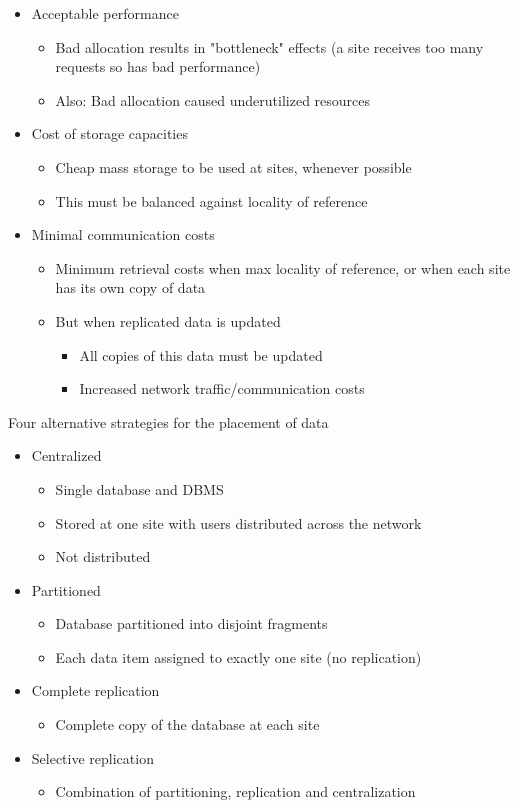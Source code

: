 \documentclass{article}[18pt]
\begin{document}
\begin{itemize}
	\item Acceptable performance
	\begin{itemize}
		\item Bad allocation results in "bottleneck" effects (a site receives too many requests so has bad performance)
		\item Also: Bad allocation caused underutilized resources
	\end{itemize}
	\item Cost of storage capacities
	\begin{itemize}
		\item Cheap mass storage to be used at sites, whenever possible
		\item This must be balanced against locality of reference
	\end{itemize}
	\item Minimal communication costs
	\begin{itemize}
		\item Minimum retrieval costs when max locality of reference, or when each site has its own copy of data
		\item But when replicated data is updated
		\begin{itemize}
			\item All copies of this data must be updated
			\item Increased network traffic/communication costs
		\end{itemize}
	\end{itemize}
\end{itemize}
Four alternative strategies for the placement of data
\begin{itemize}
	\item Centralized
	\begin{itemize}
		\item Single database and DBMS
		\item Stored at one site with users distributed across the network
		\item Not distributed
	\end{itemize}
	\item Partitioned
	\begin{itemize}
		\item Database partitioned into disjoint fragments
		\item Each data item assigned to exactly one site (no replication)
	\end{itemize}
	\item Complete replication
	\begin{itemize}
		\item Complete copy of the database at each site
	\end{itemize}
	\item Selective replication
	\begin{itemize}
		\item Combination of partitioning, replication and centralization
	\end{itemize}
\end{itemize}
\end{document}
